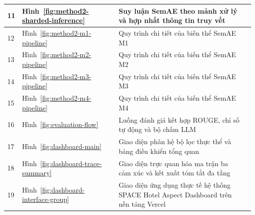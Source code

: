 \documentclass[12pt,a4paper]{report}
\begin{document}
\begin{longtable}{|p{}|p{}|p{}|p{}|}
11 & Hình~\ref{fig:method2-sharded-inference} & Suy luận SemAE theo mảnh xử lý và hợp nhất thông tin truy vết & \pageref{fig:method2-sharded-inference} \\ \hline
12 & Hình~\ref{fig:method2-m1-pipeline} & Quy trình chi tiết của biến thể SemAE M1 & \pageref{fig:method2-m1-pipeline} \\ \hline
13 & Hình~\ref{fig:method2-m2-pipeline} & Quy trình chi tiết của biến thể SemAE M2 & \pageref{fig:method2-m2-pipeline} \\ \hline
14 & Hình~\ref{fig:method2-m3-pipeline} & Quy trình chi tiết của biến thể SemAE M3 & \pageref{fig:method2-m3-pipeline} \\ \hline
15 & Hình~\ref{fig:method2-m4-pipeline} & Quy trình chi tiết của biến thể SemAE M4 & \pageref{fig:method2-m4-pipeline} \\ \hline
16 & Hình~\ref{fig:evaluation-flow} & Luồng đánh giá kết hợp ROUGE, chỉ số tự động và bộ chấm LLM & \pageref{fig:evaluation-flow} \\ \hline
17 & Hình~\ref{fig:dashboard-main} & Giao diện phân hệ bộ lọc thực thể và bảng điều khiển tổng quan & \pageref{fig:dashboard-main} \\ \hline
18 & Hình~\ref{fig:dashboard-trace-summary} & Giao diện trực quan hóa ma trận ba cảm xúc và kết xuất tóm tắt đa tầng & \pageref{fig:dashboard-trace-summary} \\ \hline
19 & Hình~\ref{fig:dashboard-interface-group} & Giao diện ứng dụng thực tế hệ thống SPACE Hotel Aspect Dashboard trên nền tảng Vercel & \pageref{fig:dashboard-interface-group} \\ \hline
\end{longtable}
\renewcommand{\arraystretch}{1.0}
\clearpage
{}





\clearpage
{}
\clearpage
{}
{}
\nocite{*}


\end{document}
